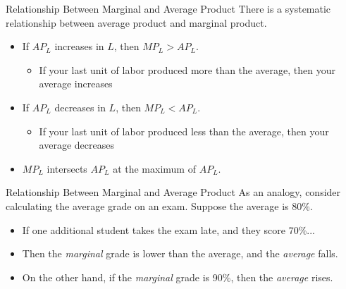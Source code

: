 \documentclass[11pt,t]{beamer}
\begin{document}
\begin{frame}{Relationship Between Marginal and Average Product}
  There is a systematic relationship between average product and marginal product.
  
  \bigskip
  \begin{itemize}
    \item If $AP_L$ increases in $L$, then $MP_L > AP_L$.
    \begin{itemize}
      \item If your last unit of labor produced more than the average, then your average increases
    \end{itemize}

    \pause
    \item If $AP_L$ decreases in $L$, then $MP_L < AP_L$.
    \begin{itemize}
      \item If your last unit of labor produced less than the average, then your average decreases
    \end{itemize}

    \pause
    \item $MP_L$ intersects $AP_L$ at the maximum of $AP_L$.
  \end{itemize}
\end{frame}

\begin{frame}{Relationship Between Marginal and Average Product}
  As an analogy, consider calculating the average grade on an exam. Suppose the average is 80\%.

  \bigskip
  \begin{itemize}
    \item If one additional student takes the exam late, and they score 70\%...

    \item Then the \textit{marginal} grade is lower than the average, and the \textit{average} falls.

    \item On the other hand, if the \textit{marginal} grade is 90\%, then the \textit{average} rises.
  \end{itemize}
\end{frame}
\end{document}
